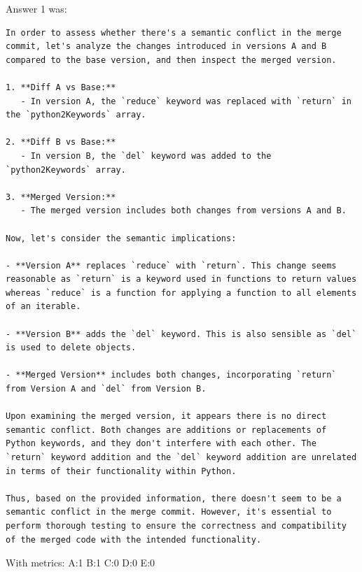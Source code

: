 Answer 1 was:
\begin{lstlisting}
In order to assess whether there's a semantic conflict in the merge commit, let's analyze the changes introduced in versions A and B compared to the base version, and then inspect the merged version.

1. **Diff A vs Base:**
   - In version A, the `reduce` keyword was replaced with `return` in the `python2Keywords` array.

2. **Diff B vs Base:**
   - In version B, the `del` keyword was added to the `python2Keywords` array.

3. **Merged Version:**
   - The merged version includes both changes from versions A and B.

Now, let's consider the semantic implications:

- **Version A** replaces `reduce` with `return`. This change seems reasonable as `return` is a keyword used in functions to return values whereas `reduce` is a function for applying a function to all elements of an iterable.
  
- **Version B** adds the `del` keyword. This is also sensible as `del` is used to delete objects.

- **Merged Version** includes both changes, incorporating `return` from Version A and `del` from Version B.

Upon examining the merged version, it appears there is no direct semantic conflict. Both changes are additions or replacements of Python keywords, and they don't interfere with each other. The `return` keyword addition and the `del` keyword addition are unrelated in terms of their functionality within Python.

Thus, based on the provided information, there doesn't seem to be a semantic conflict in the merge commit. However, it's essential to perform thorough testing to ensure the correctness and compatibility of the merged code with the intended functionality.
\end{lstlisting}

With metrics:
A:1
B:1
C:0
D:0
E:0

